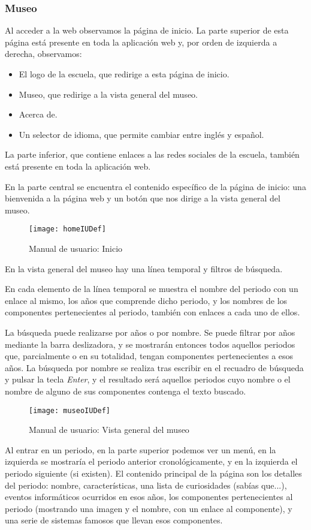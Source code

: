 \subsubsection{Museo}
Al acceder a la web observamos la página de inicio. La parte superior de esta página está presente en toda la aplicación web y, por orden de izquierda a derecha, observamos:
\begin{itemize}
	\item El logo de la escuela, que redirige a esta página de inicio.
	\item Museo, que redirige a la vista general del museo.
	\item Acerca de.
	\item Un selector de idioma, que permite cambiar entre inglés y español.
\end{itemize}
La parte inferior, que contiene enlaces a las redes sociales de la escuela, también está presente en toda la aplicación web.\par
En la parte central se encuentra el contenido específico de la página de inicio: una bienvenida a la página web y un botón que nos dirige a la vista general del museo.
\begin{figure}[H]
\centering
\centerline{\texttt{[image: homeIUDef]}}
\caption{Manual de usuario: Inicio}
\end{figure}
En la vista general del museo hay una línea temporal y filtros de búsqueda.\par
En cada elemento de la línea temporal se muestra el nombre del periodo con un enlace al mismo, los años que comprende dicho periodo, y los nombres de los componentes pertenecientes al periodo, también con enlaces a cada uno de ellos.\par
La búsqueda puede realizarse por años o por nombre. Se puede filtrar por años mediante la barra deslizadora, y se mostrarán entonces todos aquellos periodos que, parcialmente o en su totalidad, tengan componentes pertenecientes a esos años. La búsqueda por nombre se realiza tras escribir en el recuadro de búsqueda y pulsar la tecla \textit{Enter}, y el resultado será aquellos periodos cuyo nombre o el nombre de alguno de sus componentes contenga el texto buscado.
\begin{figure}[H]
\centering
\centerline{\texttt{[image: museoIUDef]}}
\caption{Manual de usuario: Vista general del museo}
\end{figure}
Al entrar en un periodo, en la parte superior podemos ver un menú, en la izquierda se mostraría el periodo anterior cronológicamente, y en la izquierda el periodo siguiente (si existen). El contenido principal de la página son los detalles del periodo: nombre, características, una lista de curiosidades (sabías que...), eventos informáticos ocurridos en esos años, los componentes pertenecientes al periodo (mostrando una imagen y el nombre, con un enlace al componente), y una serie de sistemas famosos que llevan esos componentes. 
